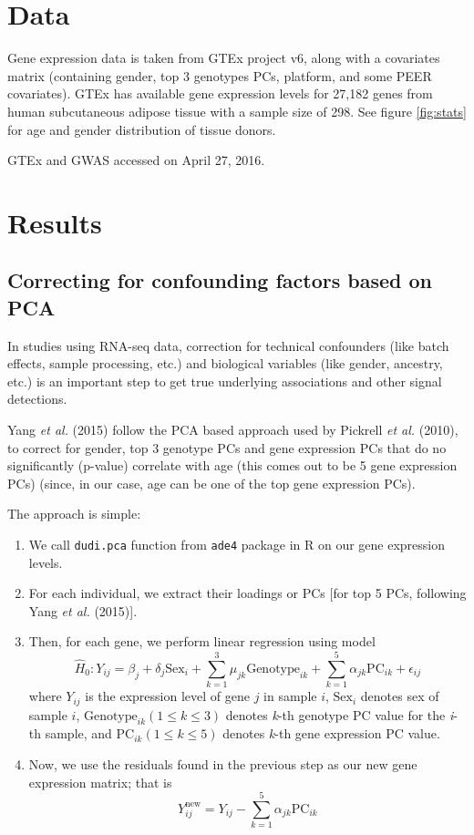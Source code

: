 \documentclass[11pt, oneside]{article}   	%
\begin{document}
\section{Data}

Gene expression data is taken from GTEx project v6, along with a covariates matrix (containing gender, top 3 genotypes PCs, platform, and some PEER covariates). GTEx has available gene expression levels for 27,182 genes from human subcutaneous adipose tissue with a sample size of 298. See figure \ref{fig:stats} for age and gender distribution of tissue donors.

GTEx and GWAS accessed on April 27, 2016.

\section{Results}

\subsection*{Correcting for confounding factors based on PCA}

In studies using RNA-seq data, correction for technical confounders (like batch effects, sample processing, etc.) and biological variables (like gender, ancestry, etc.) is an important step to get true underlying associations and other signal detections.

Yang \emph{et al.} (2015) follow the PCA based approach used by Pickrell \emph{et al.} (2010), to correct for gender, top 3 genotype PCs and gene expression PCs that do no significantly (p-value) correlate with age (this comes out to be 5 gene expression PCs) (since, in our case, age can be one of the top gene expression PCs).

The approach is simple:
\begin{enumerate}
\item We call \texttt{dudi.pca} function from \texttt{ade4} package in R on our gene expression levels.
\item For each individual, we extract their loadings or PCs [for top 5 PCs, following Yang \emph{et al.} (2015)].
\item Then, for each gene, we perform linear regression using model
$$ \hat{H}_0: Y_{ij} = \beta_{j} + \delta_{j} \text{Sex}_{i} + \sum_{k=1}^{3} \mu_{jk} \text{Genotype}_{ik} + \sum_{k=1}^{5} \alpha_{jk} \text{PC}_{ik} + \epsilon_{ij} $$
where $ Y_{ij} $ is the expression level of gene $ j $ in sample $ i $, $ \text{Sex}_{i} $ denotes sex of sample $ i $, $ \text{Genotype}_{ik} (1 \leq k \leq 3) $ denotes \emph{k}-th genotype PC value for the \emph{i}-th sample, and $ \text{PC}_{ik} (1 \leq k \leq 5) $ denotes \emph{k}-th gene expression PC value.
\item Now, we use the residuals found in the previous step as our new gene expression matrix; that is
$$ Y_{ij}^{\text{new}} = Y_{ij} - \sum_{k=1}^{5} \alpha_{jk} \text{PC}_{ik} $$
\end{enumerate}
\end{document}

